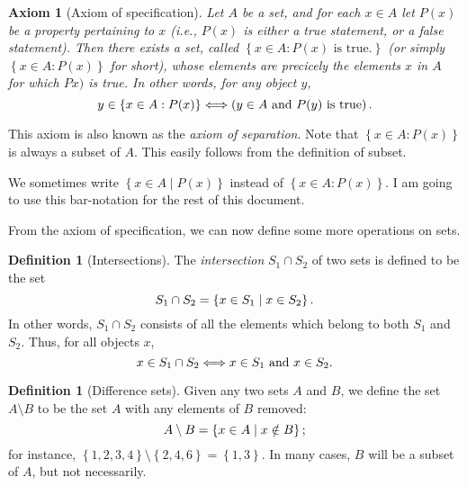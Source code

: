 \documentclass[a4paper, twocolumn]{report}
\newcounter{dummy} \numberwithin{dummy}{section}
\newcounter{axmcntr} \numberwithin{axmcntr}{chapter}
\newtheorem{axm}[axmcntr]{Axiom}
\theoremstyle{definition}
\newtheorem{defn}[dummy]{Definition}
\theoremstyle{solution}
\newcommand{\intrsct}{\cap}
\begin{document}
\begin{axm}[Axiom of specification]
  \label{axm_35}
  Let $A$ be a set, and for each $x \in A$ let $P(x)$ be a property pertaining
  to $x$ (i.e., $P(x)$ is either a true statement, or a false statement). Then
  there exists a set, called $\left\{ x \in A : P(x) \text{ is true.} \right\}$
  (or simply $\left\{x \in A : P(x)\right\}$ for short), whose elements are
  precicely the elements $x$ in $A$ for which $Px)$ is true. In other words,
  for any object $y$,
\begin{equation}
  \notag
  y \in \left\{ x \in A : P(x) \right\} \Longleftrightarrow \left( y \in A \text{ and } P(y) \text{ is true}\right).
\end{equation}
\end{axm}

This axiom is also known as the \textit{axiom of separation}. Note that
$\left\{ x \in A : P(x) \right\}$ is always a subset of $A$. This easily
follows from the definition of subset. 

We sometimes write $\left\{ x \in A \mid P(x) \right\}$ instead of $\left\{ x
\in A : P(x) \right\}$. I am going to use this bar-notation for the rest of this
document.
\addtocounter{dummy}{1}

From the axiom of specification, we can now define some more operations on sets.

\begin{defn}[Intersections]
  \label{defn_3123} 
  The \textit{intersection} $S_1 \intrsct S_2$ of two sets is defined to be the set
  \begin{equation}
    \notag
    S_1 \intrsct S_2 = \left\{ x \in S_1 \mid x \in S_2 \right\}.
  \end{equation}
  In other words, $S_1 \intrsct S_2$ consists of all the elements which belong to both $S_1$ and $S_2$. Thus, for all objects $x$,
  \begin{equation}
    \notag
    x \in S_1 \intrsct S_2 \Longleftrightarrow x \in S_1 \text { and } x \in S_2.
  \end{equation}
\end{defn}

\addtocounter{dummy}{3}

\begin{defn}[Difference sets]
  \label{defn_3127}
  Given any two sets $A$ and $B$, we define the set $A \setminus B$ to be the set $A$
  with any elements of $B$ removed:
  \begin{equation}
    \notag
    A \setminus B = \left\{ x \in A \mid x \notin B \right\};
  \end{equation}
  for instance, $\left\{ 1, 2, 3, 4 \right\} \setminus \left\{ 2, 4, 6 \right\} =
  \left\{ 1, 3 \right\}$. In many cases, $B$ will be a subset of $A$, but not
  necessarily.
\end{defn}
\end{document}

